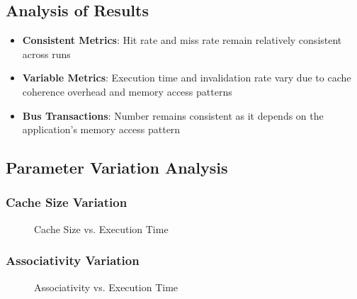 \documentclass{article}
\begin{document}
\subsection{Analysis of Results}
\begin{itemize}
    \item \textbf{Consistent Metrics}: Hit rate and miss rate remain relatively consistent across runs
    \item \textbf{Variable Metrics}: Execution time and invalidation rate vary due to cache coherence overhead and memory access patterns
    \item \textbf{Bus Transactions}: Number remains consistent as it depends on the application's memory access pattern
\end{itemize}

\subsection{Parameter Variation Analysis}
\subsubsection{Cache Size Variation}
\begin{figure}[H]
    \centering
    \caption{Cache Size vs. Execution Time}
\end{figure}

\subsubsection{Associativity Variation}
\begin{figure}[H]
    \centering
    \caption{Associativity vs. Execution Time}
\end{figure}
\end{document}

